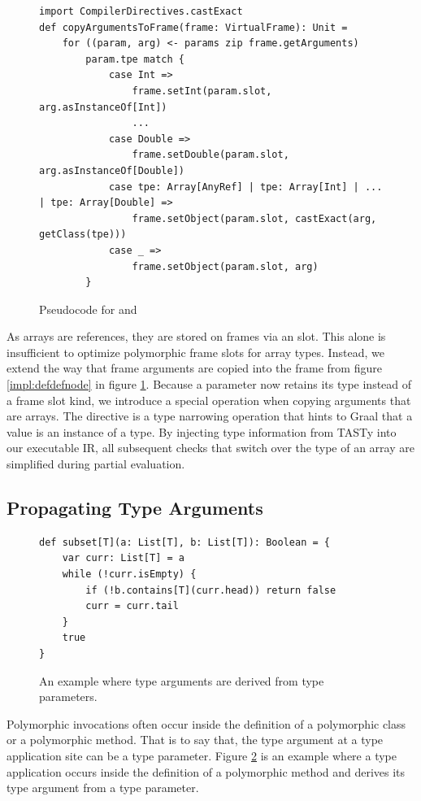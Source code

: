 \begin{figure}[!htb]
\begin{verbatim}
import CompilerDirectives.castExact
def copyArgumentsToFrame(frame: VirtualFrame): Unit = 
	for ((param, arg) <- params zip frame.getArguments) 
		param.tpe match {
			case Int =>
				frame.setInt(param.slot, arg.asInstanceOf[Int])
				...
			case Double =>
				frame.setDouble(param.slot, arg.asInstanceOf[Double])	
			case tpe: Array[AnyRef] | tpe: Array[Int] | ... | tpe: Array[Double] =>
				frame.setObject(param.slot, castExact(arg, getClass(tpe)))
			case _ =>
				frame.setObject(param.slot, arg)
		}
\end{verbatim}
\caption{Pseudocode for  and }
\label{impl:specialized-copy-arguments}
\end{figure}

As arrays are references, they are stored on frames via an  slot.
This alone is insufficient to optimize polymorphic frame slots for array types.
Instead, we extend the way that frame arguments are copied into the frame from figure \ref{impl:defdefnode} in figure \ref{impl:specialized-copy-arguments}.
Because a parameter now retains its type instead of a frame slot kind, we introduce a special operation when copying arguments that are arrays. 
The  directive is a type narrowing operation that hints to Graal that a value is an instance of a type.
By injecting type information from TASTy into our executable IR, all subsequent checks that switch over the type of an array are simplified during partial evaluation.

\subsection{Propagating Type Arguments}

\begin{figure}[!htb]
\begin{verbatim}
def subset[T](a: List[T], b: List[T]): Boolean = {
	var curr: List[T] = a
	while (!curr.isEmpty) {
		if (!b.contains[T](curr.head)) return false
		curr = curr.tail
	}
	true 
}
\end{verbatim}
\caption{An example where type arguments are derived from type parameters.}
\label{impl:list-subset}
\end{figure}

Polymorphic invocations often occur inside the definition of a polymorphic class or a polymorphic method.
That is to say that, the type argument at a type application site can be a type parameter.
Figure \ref{impl:list-subset} is an example where a type application occurs inside the definition of a polymorphic method and derives its type argument from a type parameter.

